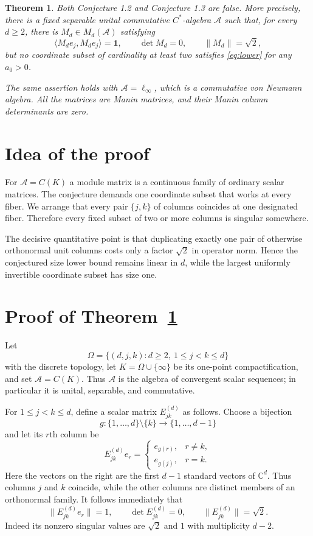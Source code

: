 \documentclass[11pt]{article}
\newtheorem{theorem}{Theorem}
\newcommand{\A}{\mathcal A}
\newcommand{\C}{\mathbb C}
\newcommand{\one}{\mathbf 1}
\begin{document}
\begin{theorem}\label{thm:main}
Both Conjecture 1.2 and Conjecture 1.3 are false.  More precisely, there is
a fixed separable unital commutative $C^*$-algebra $\A$ such that, for
every $d\ge2$, there is $M_d\in M_d(\A)$ satisfying
\[
 \langle M_de_j,M_de_j\rangle=\one,\qquad
 \det M_d=0,\qquad \|M_d\|=\sqrt2,
\]
but no coordinate subset of cardinality at least two satisfies
\eqref{eq:lower} for any $a_0>0$.

The same assertion holds with $\A=\ell_\infty$, which is a commutative
von Neumann algebra.  All the matrices are Manin matrices, and their Manin
column determinants are zero.
\end{theorem}

\section{Idea of the proof}

For $\A=C(K)$ a module matrix is a continuous family of ordinary scalar
matrices.  The conjecture demands one coordinate subset that works at
every fiber.  We arrange that every pair $\{j,k\}$ of columns coincides at
one designated fiber.  Therefore every fixed subset of two or more
columns is singular somewhere.

The decisive quantitative point is that duplicating exactly one pair of
otherwise orthonormal unit columns costs only a factor $\sqrt2$ in
operator norm.  Hence the conjectured size lower bound remains linear in
$d$, while the largest uniformly invertible coordinate subset has size
one.

\section{Proof of Theorem~\ref{thm:main}}

Let
\[
 \Omega=\{(d,j,k):d\ge2,\ 1\le j<k\le d\}
\]
with the discrete topology, let $K=\Omega\cup\{\infty\}$ be its one-point
compactification, and set $\A=C(K)$.  Thus $\A$ is the algebra of
convergent scalar sequences; in particular it is unital, separable, and
commutative.

For $1\le j<k\le d$, define a scalar matrix $E_{jk}^{(d)}$ as follows.
Choose a bijection
\[
 g:\{1,\ldots,d\}\setminus\{k\}\longrightarrow\{1,\ldots,d-1\}
\]
and let its $r$th column be
\[
 E_{jk}^{(d)}e_r=
 \begin{cases}
  e_{g(r)},&r\ne k,\\
  e_{g(j)},&r=k.
 \end{cases}
\]
Here the vectors on the right are the first $d-1$ standard vectors of
$\C^d$.  Thus columns $j$ and $k$ coincide, while the other columns are
distinct members of an orthonormal family.  It follows immediately that
\begin{equation}\label{eq:fiberfacts}
 \|E_{jk}^{(d)}e_r\|=1,\qquad
 \det E_{jk}^{(d)}=0,\qquad
 \|E_{jk}^{(d)}\|=\sqrt2.
\end{equation}
Indeed its nonzero singular values are $\sqrt2$ and $1$ with multiplicity
$d-2$.
\end{document}
